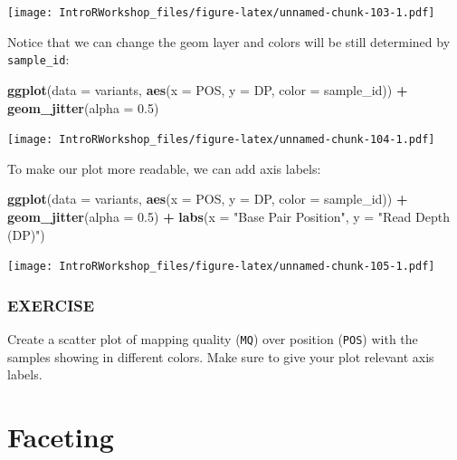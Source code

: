 \documentclass[
]{book}
\newenvironment{Shaded}{\begin{snugshade}}{\end{snugshade}}
\newcommand{\AttributeTok}[1]{\textcolor[rgb]{0.13,0.29,0.53}{#1}}
\newcommand{\FloatTok}[1]{\textcolor[rgb]{0.00,0.00,0.81}{#1}}
\newcommand{\FunctionTok}[1]{\textcolor[rgb]{0.13,0.29,0.53}{\textbf{#1}}}
\newcommand{\NormalTok}[1]{#1}
\newcommand{\SpecialCharTok}[1]{\textcolor[rgb]{0.81,0.36,0.00}{\textbf{#1}}}
\newcommand{\StringTok}[1]{\textcolor[rgb]{0.31,0.60,0.02}{#1}}
\begin{document}
\texttt{[image: IntroRWorkshop\_files/figure-latex/unnamed-chunk-103-1.pdf]}

Notice that we can change the geom layer and colors will be still determined by \texttt{sample\_id}:

\begin{Shaded}
\begin{Highlighting}[]
\FunctionTok{ggplot}\NormalTok{(}\AttributeTok{data =}\NormalTok{ variants, }\FunctionTok{aes}\NormalTok{(}\AttributeTok{x =}\NormalTok{ POS, }\AttributeTok{y =}\NormalTok{ DP, }\AttributeTok{color =}\NormalTok{ sample\_id)) }\SpecialCharTok{+}
  \FunctionTok{geom\_jitter}\NormalTok{(}\AttributeTok{alpha =} \FloatTok{0.5}\NormalTok{)}
\end{Highlighting}
\end{Shaded}

\texttt{[image: IntroRWorkshop\_files/figure-latex/unnamed-chunk-104-1.pdf]}

To make our plot more readable, we can add axis labels:

\begin{Shaded}
\begin{Highlighting}[]
\FunctionTok{ggplot}\NormalTok{(}\AttributeTok{data =}\NormalTok{ variants, }\FunctionTok{aes}\NormalTok{(}\AttributeTok{x =}\NormalTok{ POS, }\AttributeTok{y =}\NormalTok{ DP, }\AttributeTok{color =}\NormalTok{ sample\_id)) }\SpecialCharTok{+}
  \FunctionTok{geom\_jitter}\NormalTok{(}\AttributeTok{alpha =} \FloatTok{0.5}\NormalTok{) }\SpecialCharTok{+}
  \FunctionTok{labs}\NormalTok{(}\AttributeTok{x =} \StringTok{"Base Pair Position"}\NormalTok{,}
       \AttributeTok{y =} \StringTok{"Read Depth (DP)"}\NormalTok{)}
\end{Highlighting}
\end{Shaded}

\texttt{[image: IntroRWorkshop\_files/figure-latex/unnamed-chunk-105-1.pdf]}

\subsubsection*{EXERCISE}\label{exercise-3}

Create a scatter plot of mapping quality (\texttt{MQ}) over position (\texttt{POS}) with the samples showing in different colors. Make sure to give your plot relevant axis labels.

\section{Faceting}\label{faceting}
\end{document}
